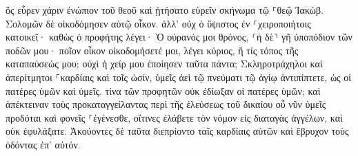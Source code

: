\documentclass{openreader}
\begin{document}
ὃς εὗρεν χάριν ἐνώπιον τοῦ θεοῦ καὶ ᾐτήσατο εὑρεῖν σκήνωμα τῷ ⸀θεῷ Ἰακώβ. 
Σολομῶν δὲ οἰκοδόμησεν αὐτῷ οἶκον. 
ἀλλ’ οὐχ ὁ ὕψιστος ἐν ⸀χειροποιήτοις κατοικεῖ· καθὼς ὁ προφήτης λέγει· 
Ὁ οὐρανός μοι θρόνος, ⸂ἡ δὲ⸃ γῆ ὑποπόδιον τῶν ποδῶν μου· ποῖον οἶκον οἰκοδομήσετέ μοι, λέγει κύριος, ἢ τίς τόπος τῆς καταπαύσεώς μου; 
οὐχὶ ἡ χείρ μου ἐποίησεν ταῦτα πάντα; 
Σκληροτράχηλοι καὶ ἀπερίτμητοι ⸀καρδίαις καὶ τοῖς ὠσίν, ὑμεῖς ἀεὶ τῷ πνεύματι τῷ ἁγίῳ ἀντιπίπτετε, ὡς οἱ πατέρες ὑμῶν καὶ ὑμεῖς. 
τίνα τῶν προφητῶν οὐκ ἐδίωξαν οἱ πατέρες ὑμῶν; καὶ ἀπέκτειναν τοὺς προκαταγγείλαντας περὶ τῆς ἐλεύσεως τοῦ δικαίου οὗ νῦν ὑμεῖς προδόται καὶ φονεῖς ⸀ἐγένεσθε, 
οἵτινες ἐλάβετε τὸν νόμον εἰς διαταγὰς ἀγγέλων, καὶ οὐκ ἐφυλάξατε. 
Ἀκούοντες δὲ ταῦτα διεπρίοντο ταῖς καρδίαις αὐτῶν καὶ ἔβρυχον τοὺς ὀδόντας ἐπ’ αὐτόν. 
\end{document}
